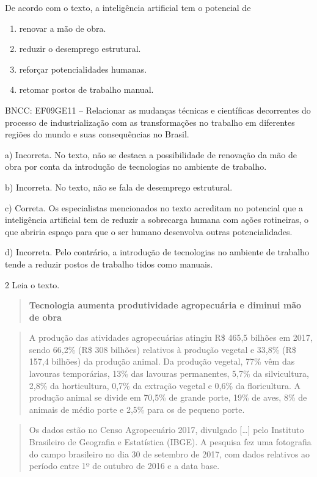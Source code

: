 De acordo com o texto, a inteligência artificial tem o potencial de

\begin{enumerate}
\def\labelenumi{\alph{enumi})}
\tightlist
\item
  renovar a mão de obra.
\item
  reduzir o desemprego estrutural.
\item
  reforçar potencialidades humanas.
\item
  retomar postos de trabalho manual.
\end{enumerate}

BNCC: EF09GE11 -- Relacionar as mudanças técnicas e científicas
decorrentes do processo de industrialização com as transformações no
trabalho em diferentes regiões do mundo e suas consequências no Brasil.

a) Incorreta. No texto, não se destaca a possibilidade de renovação da
mão de obra por conta da introdução de tecnologias no ambiente de
trabalho.

b) Incorreta. No texto, não se fala de desemprego estrutural.

c) Correta. Os especialistas mencionados no texto acreditam no potencial
que a inteligência artificial tem de reduzir a sobrecarga humana com
ações rotineiras, o que abriria espaço para que o ser humano desenvolva
outras potencialidades.

d) Incorreta. Pelo contrário, a introdução de tecnologias no ambiente de
trabalho tende a reduzir postos de trabalho tidos como manuais.

\num{2} Leia o texto.

\begin{quote}
\textbf{Tecnologia aumenta produtividade agropecuária e diminui mão de
obra}
\end{quote}

\begin{quote}
A produção das atividades agropecuárias atingiu R\$ 465,5 bilhões em
2017, sendo 66,2\% (R\$ 308 bilhões) relativos à produção vegetal e
33,8\% (R\$ 157,4 bilhões) da produção animal. Da produção vegetal, 77\%
vêm das lavouras temporárias, 13\% das lavouras permanentes, 5,7\% da
silvicultura, 2,8\% da horticultura, 0,7\% da extração vegetal e 0,6\%
da floricultura. A produção animal se divide em 70,5\% de grande porte,
19\% de aves, 8\% de animais de médio porte e 2,5\% para os de pequeno
porte.
\end{quote}

\begin{quote}
Os dados estão no Censo Agropecuário 2017, divulgado {[}\ldots{}{]} pelo
Instituto Brasileiro de Geografia e Estatística (IBGE). A pesquisa fez
uma fotografia do campo brasileiro no dia 30 de setembro de 2017, com
dados relativos ao período entre 1º de outubro de 2016 e a data base.
\end{quote}

